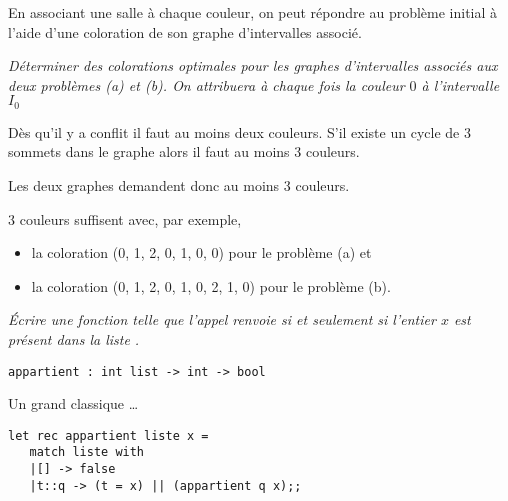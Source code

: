 En associant une salle à chaque couleur, on peut répondre au problème initial à l'aide d'une coloration de son graphe d'intervalles associé.
\begin{Exercise}\it
Déterminer des colorations optimales pour les graphes d'intervalles associés aux deux problèmes (a) et (b). On attribuera à chaque fois la couleur $0$ à l'intervalle $I_0$
\end{Exercise}  
\begin{Answer}
Dès qu'il y a conflit il faut au moins deux couleurs.
S'il existe un cycle de 3 sommets dans le graphe alors il faut au moins 3 couleurs.

Les deux graphes demandent donc au moins 3 couleurs.

3 couleurs suffisent avec, par exemple,
\begin{itemize}
\item la coloration (0, 1, 2, 0, 1, 0, 0) pour le problème (a) et
\item la coloration (0, 1, 2, 0, 1, 0, 2, 1, 0) pour le problème (b).
\end{itemize}
\end{Answer}
\begin{Exercise}\it
Écrire une fonction  telle que l'appel  renvoie  si et seulement si l'entier $x$ est présent dans la liste .
\end{Exercise}  
\begin{lstlisting}
appartient : int list -> int -> bool
\end{lstlisting}
\begin{Answer}
Un grand classique \dots
\begin{lstlisting}
let rec appartient liste x =
   match liste with
   |[] -> false
   |t::q -> (t = x) || (appartient q x);;
\end{lstlisting}
\end{Answer}
